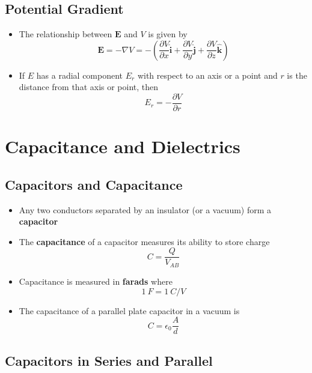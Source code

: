 \documentclass{article}
\begin{document}
\subsection{Potential Gradient}

\begin{itemize}
  \item The relationship between $\mathbf{E}$ and $V$ is given by \[\mathbf{E} = -\nabla V = -\left( \frac{\partial V}{\partial x} \hat{\mathbf{i}} + \frac{\partial V}{\partial y} \hat{\mathbf{j}} + \frac{\partial V}{\partial z} \hat{\mathbf{k}} \right)\]

  \item If $E$ has a radial component $E_r$ with respect to an axis or a point and $r$ is the distance from that axis or point, then \[E_r = -\frac{\partial V}{\partial r}\]
\end{itemize}

\section{Capacitance and Dielectrics}

\subsection{Capacitors and Capacitance}

\begin{itemize}
  \item Any two conductors separated by an insulator (or a vacuum) form a \textbf{capacitor}

  \item The \textbf{capacitance} of a capacitor measures its ability to store charge \[C = \frac{Q}{V_{AB}}\]

  \item Capacitance is measured in \textbf{farads} where \[\qty{1}{F} = \qty{1}{C/V}\]

  \item The capacitance of a parallel plate capacitor in a vacuum is \[C = \epsilon_0 \frac{A}{d}\]
\end{itemize}

\subsection{Capacitors in Series and Parallel}
\end{document}
